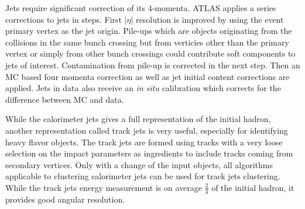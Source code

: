 Jets require significant correction of its 4-momenta. ATLAS applies a series corrections\cite{PERF-2016-04} to jets in steps. First $|\eta|$ resolution is improved by using the event primary vertex as the jet origin. Pile-ups which are objects originating from the collisions in the same bunch crossing but from verticies other than the primary vertex or simply from other bunch crossings could contribute soft components to jets of interest. Contamination from pile-up is corrected in the next step. Then an MC based four momenta correction as well as jet initial content corrections are applied. Jets in data also receive an \textit{in situ} calibration which corrects for the difference between MC and data.

While the calorimeter jets gives a full representation of the initial hadron, another representation called track jets is very useful, especially for identifying heavy flavor objects. The track jets are formed using tracks with a very loose selection on the impact parameters as ingredients to include tracks coming from secondary vertices. Only with a change of the input objects, all algorithms applicable to clustering calorimeter jets can be used for track jets clustering. While the track jets energy measurement is on average $\frac{2}{3}$ of the initial hadron, it provides good angular resolution. 
